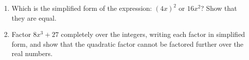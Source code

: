 \begin{enumerate}
\item[(a)] Which is the simplified form of the expression: $(4x)^2$ or $16x^2$? Show that they are equal.
\item[(b)] Factor $8x^3+27$ completely over the integers, writing each factor in simplified form, and show that the quadratic factor cannot be factored further over the real numbers.
\end{enumerate}
